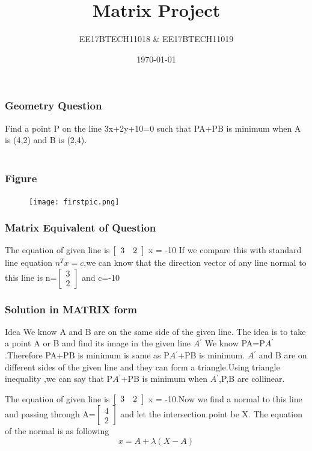 \documentclass{beamer}
\title[Short title]{Matrix Project } %
\author{EE17BTECH11018 \& EE17BTECH11019} %
\institute[IIT Hyderabad] %
{
IIT Hyderabad \\ %
\medskip
\textit{EE 1390-INTRO to AI and ML} 
}
\date{\today} %
\begin{document}
\begin{frame}
\titlepage %
\end{frame}




\begin{frame}
\frametitle{Geometry Question}
Find a point P on the line 3x+2y+10=0 such that PA+PB is minimum when A is (4,2) and B is (2,4).\\~\\
\end{frame}

\begin{frame}
\frametitle{Figure}
\begin{figure}
\texttt{[image: firstpic.png]}
\end{figure}
\end{frame}


\begin{frame}
\frametitle{Matrix Equivalent of Question}
The equation of given line is $ \left[ 
  \begin{array}{ c c }
     3 & 2 
     \end{array} \right]$ x = -10 \newline If we compare this with standard line equation $n{^T}x=c$,we can know that the direction vector of any line normal to this line is n=$ \left[ 
  \begin{array}{ c  }
     3\\
     2
  \end{array} \right]$ and c=-10


\end{frame}


\begin{frame}
\frametitle{Solution in MATRIX form}
\begin{block}{Idea}
We know A and B are on the same side of the given line. The idea is to take a point A or B and find its image in the given line $A{^\prime}$
\newline We know PA=P$A{^\prime}$.Therefore PA+PB is minimum is same as P$A{^\prime}$+PB is minimum.
\newline $A{^\prime}$ and B are on different sides of the given line and they can form a triangle.Using triangle inequality ,we can say that P$A{^\prime}$+PB is minimum when $A{^\prime}$,P,B are collinear. 
\end{block}

The equation of given line is  $ \left[ 
  \begin{array}{ c c }
     3 & 2 
     \end{array} \right]$ x = -10.\newline Now we find a normal to this line and passing through A=$ \left[ 
  \begin{array}{ c  }
     4\\
     2
  \end{array} \right]$ and let the intersection point be X. The equation of the normal is as following $$ x = A+\lambda(X-A)$$


\end{frame}
\end{document}

